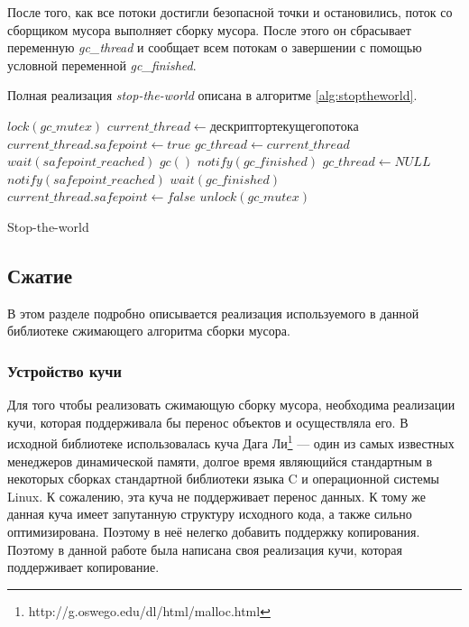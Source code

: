 \documentclass[14pt]{matmex-diploma}
\begin{document}
После того, как все потоки достигли безопасной точки и остановились, поток со сборщиком мусора выполняет сборку мусора. После этого он сбрасывает переменную \textit{gc\_thread} и сообщает всем потокам о завершении с помощью условной переменной \textit{gc\_finished}.

Полная реализация \textit{stop-the-world} описана в алгоритме \ref{alg:stoptheworld}.

\begin{algorithm}[h]
\begin{algorithmic}[1]
\State $lock(gc\_mutex)$
\State $current\_thread \gets дескриптор текущего потока$ 
\State $current\_thread.safepoint \gets true$
    \State $gc\_thread \gets current\_thread$
            \State $wait(safepoint\_reached)$
        \EndIf
    \EndFor
    \State $gc()$
    \State $notify(gc\_finished)$
    \State $gc\_thread \gets NULL$
\Else
    \State $notify(safepoint\_reached)$
    \State $wait(gc\_finished)$
\EndIf
\State $current\_thread.safepoint \gets false$
\State $unlock(gc\_mutex)$
\end{algorithmic}
\caption{Stop-the-world}\label{alg:stoptheworld}
\end{algorithm}
\subsection{Сжатие}
В этом разделе подробно описывается реализация используемого в данной библиотеке сжимающего алгоритма сборки мусора.
\subsubsection{Устройство кучи}
Для того чтобы реализовать сжимающую сборку мусора, необходима реализации кучи, которая поддерживала бы перенос объектов и осуществляла его. В исходной библиотеке использовалась куча Дага Ли\footnote{http://g.oswego.edu/dl/html/malloc.html} --- один из самых известных менеджеров динамической памяти, долгое время являющийся стандартным в некоторых сборках стандартной библиотеки языка C и операционной системы Linux. К сожалению, эта куча не поддерживает перенос данных. К тому же данная куча имеет запутанную структуру исходного кода, а также сильно оптимизирована. Поэтому в неё нелегко добавить поддержку копирования. Поэтому в данной работе была написана своя реализация кучи, которая поддерживает копирование.
\end{document}
